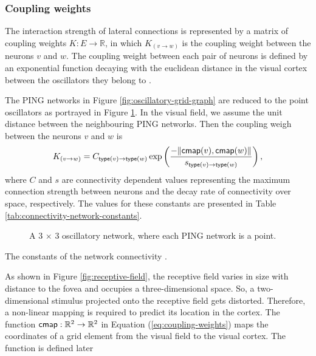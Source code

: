 \subsubsection{Coupling weights}
\label{sec:coupling-weights}

The interaction strength of lateral connections is represented by a matrix of coupling weights $K: E \to \mathbb{R}$, in which $K_{(v \to w)}$ is the coupling weight between the neurons $v$ and $w$. 
The coupling weight between each pair of neurons is defined by an exponential function decaying with the euclidean distance in the visual cortex between the oscillators they belong to \cite{Lowet2015}. 

The PING networks in Figure \ref{fig:oscillatory-grid-graph} are reduced to the point oscillators as portrayed in Figure \ref{fig:oscillatory-point-grid}. In the visual field, we assume the unit distance between the neighbouring PING networks. Then the coupling weigh between the neurons $v$ and $w$ is
\begin{equation}
    K_{(v \to w)} = C_{\mathsf{type}(v) \to \mathsf{type}(w)} \exp \left( \frac{-\| \mathsf{cmap}(v), \mathsf{cmap}(w) \|}{s_{\mathsf{type}(v) \to \mathsf{type}(w)}} \right),
    \label{eq:coupling-weights}
\end{equation}
where $C$ and $s$ are connectivity dependent values representing the maximum connection strength between neurons and the decay rate of connectivity over space, respectively. The values for these constants are presented in Table \ref{tab:connectivity-network-constants}.

\begin{figure}[!htp]
    \centering
    
    \caption[Point-PING oscillatory network]{A 3 $\times$ 3 oscillatory network, where each PING network is a point.}
    \label{fig:oscillatory-point-grid}
\end{figure}

\begin{table}[!htp] 
    \centering
    
    \caption[Constants of the network connectivity]{The constants of the network connectivity \cite{Lowet2015}.}
    \label{tab:connectivity-network-constants}
\end{table}

As shown in Figure \ref{fig:receptive-field}, the receptive field varies in size with distance to the fovea and occupies a three-dimensional space. So, a two-dimensional stimulus projected onto the receptive field gets distorted. Therefore, a non-linear mapping is required to predict its location in the cortex.
The function $\mathsf{cmap}: \mathbb{R}^2 \to \mathbb{R}^2$ in Equation (\ref{eq:coupling-weights}) maps the coordinates of a grid element from the visual field to the visual cortex. The function is defined later 

\begin{comment}

Let $\loc: V \to \mathbb{Z}_+^2$ be a function mapping a neuron to the position of the oscillator it belongs to in the grid, assuming the unit distance between the neighbouring PING networks.

\end{comment}